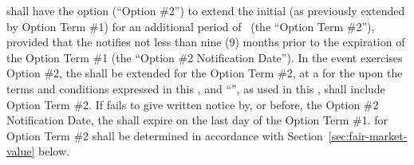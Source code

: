 \label{sec:option-ii}
\lessee shall have the option (``Option \#2'') to extend the initial \termOfLease (as previously extended by Option Term \#1) for an additional period of \optionIILengthText\ (the ``Option Term \#2''), provided that the \lessee notifies \lessor not less than nine (9) months prior to the expiration of the Option Term \#1 (the ``Option \#2 Notification Date''). In the event \lessee exercises Option \#2, the \termOfLease shall be extended for the Option Term \#2, at a \fairMarketValue for the \premises upon the terms and conditions expressed in this \lease, and ``\termOfLease'', as used in this \lease, shall include Option Term \#2. If \lessee fails to give written notice by, or before, the Option \#2 Notification Date, the \lease shall expire on the last day of the Option Term \#1. \fairMarketValue for Option Term \#2 shall be determined in accordance with Section~\ref{sec:fair-market-value} below.
